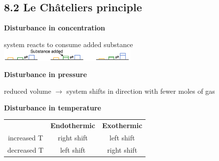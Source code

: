 \subsection{8.2 Le Châteliers principle}
    \textbf{Disturbance in concentration}
    \vspace*{0.1em}

    system reacts to consume added substance\\
    \includegraphics[width=68mm]{src/8_Chemical_Equilibria/images/chatelier_concentration.png}
    \vspace*{0.5em}

    \textbf{Disturbance in pressure}
    \vspace*{0.1em}

    reduced volume $\rightarrow$ system shifts in direction with fewer moles of gas
    \vspace*{0.1em}
    
    \textbf{Disturbance in temperature}\\
        \begin{tabular}{c c c}
             & \textbf{Endothermic} & \textbf{Exothermic}\\
            increased T & right shift & left shift \\
            decreased T & left shift & right shift
        \end{tabular}